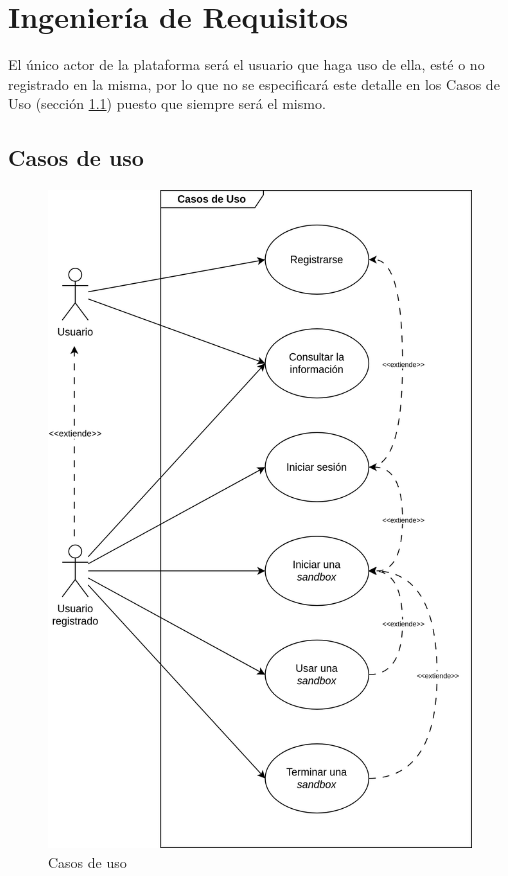     \section{Ingeniería de Requisitos}
        \label{sec:ingenieria-requisitos}
        
        El único actor de la plataforma será el usuario que haga uso de ella, esté o no registrado en la misma, por lo que no se especificará este detalle en los Casos de Uso (sección \ref{sec:casos-uso}) puesto que siempre será el mismo.
        
        \subsection{Casos de uso}
            \label{sec:casos-uso}
            
            \begin{figure}[h]
                \centering

                \includegraphics[scale=0.125]{images/Diagramas/Casos de uso.png}

                \caption{Casos de uso}
                \label{fig:casos-uso}
            \end{figure}
            
